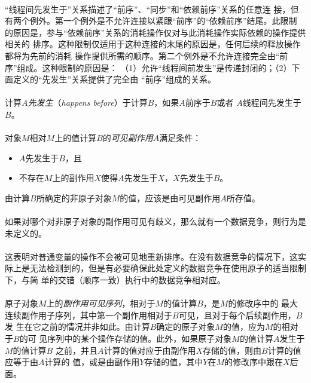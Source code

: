 \paragraph{}
\notes ``线程间先发生于''关系描述了``前序''、``同步''和``依赖前序''关系的任意连
接，但有两个例外。第一个例外是不允许连接以紧跟``前序''的``依赖前序''结尾。此限制
的原因是，参与``依赖前序''关系的消耗操作仅对与此消耗操作实际依赖的操作提供相关的
排序。这种限制仅适用于这种连接的末尾的原因是，任何后续的释放操作都将为先前的消耗
操作提供所需的顺序。第二个例外是不允许连接完全由``前序''组成。这种限制的原因是：
（1）允许``线程间前发生''是传递封闭的；（2）下面定义的``先发生''关系提供了完全由
``前序''组成的关系。

\paragraph{}
计算$A$\textit{先发生}（\textit{happens before}）于计算$B$，如果$A$前序于$B$或者
$A$线程间先发生于$B$。

\paragraph{}
对象$M$相对$M$上的值计算$B$的\textit{可见副作用}$A$满足条件：
\begin{itemize}
  \item{$A$先发生于$B$，且}
  \item{不存在$M$上的副作用$X$使得$A$先发生于$X$，$X$先发生于$B$。}
\end{itemize}
由计算$B$所确定的非原子对象$M$的值，应该是由可见副作用$A$所存值。

\paragraph{}
\notes 如果对哪个对非原子对象的副作用可见有歧义，那么就有一个数据竞争，则行为是
未定义的。

\paragraph{}
\notes 这表明对普通变量的操作不会被可见地重新排序。在没有数据竞争的情况下，这实
际上是无法检测到的，但是有必要确保此处定义的数据竞争在使用原子的适当限制下，与简
单的交错（顺序一致）执行中的数据竞争相对应。

\paragraph{}
原子对象$M$上的\textit{副作用可见序列}，相对于$M$的值计算$B$，是$M$的修改序中的
最大连续副作用子序列，其中第一个副作用相对于$B$可见，且对于每个后续副作用，$B$发
生在它之前的情况并非如此。由计算$B$确定的原子对象$M$的值，应为$M$的相对于$B$的可
见序列中的某个操作存储的值。此外，如果原子对象$M$的值计算$A$发生于$M$的值计算$B$
之前，并且$A$计算的值对应于由副作用$X$存储的值，则由$B$计算的值应等于由$A$计算的
值，或是由副作用$Y$存储的值，其中$Y$在$M$的修改序中跟在$X$后面。

